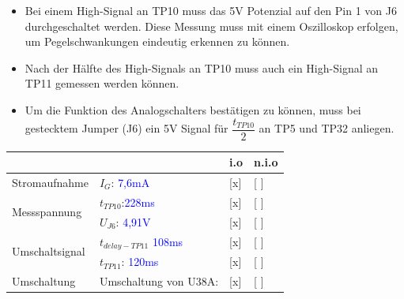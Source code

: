 \begin{itemize}
	\item{Bei einem High-Signal an TP10 muss das 5V Potenzial auf den Pin 1 von J6 durchgeschaltet werden. Diese Messung muss mit einem Oszilloskop erfolgen, um Pegelschwankungen eindeutig erkennen zu können.}
	
	\item{Nach der Hälfte des High-Signals an TP10 muss auch ein High-Signal an TP11 gemessen werden können.}
	
	\item{Um die Funktion des Analogschalters bestätigen zu können, muss bei gestecktem Jumper (J6) ein 5V Signal für $\dfrac{t_{TP10}}{2}$ an TP5 und TP32 anliegen.}
\end{itemize}


\renewcommand{\arraystretch}{2}
\begin{tabularx}{\textwidth}{p{}| p{} | p{} | p{}}

 &  & i.o & n.i.o \\

\hline

Stromaufnahme & $I_{G}$: \textcolor{blue}{7,6mA} & [x] & [ ] \\

\hline

\multirow{2}{*}{Messspannung}
		& $t_{TP10}$:\textcolor{blue}{228ms}					& [x] & [ ] \\
		& $U_{J6}$: \textcolor{blue}{4,91V}						& [x] & [ ] \\

\hline

\multirow{2}{*}{Umschaltsignal}
		& $t_{delay-TP11}$	\textcolor{blue}{108ms} 				& [x] & [ ] \\
		& $t_{TP11}$: \textcolor{blue}{120ms}						& [x] & [ ] \\

\hline

Umschaltung & Umschaltung von U38A:	& [x] & [ ] \\
		
\end{tabularx}
\renewcommand{\arraystretch}{1}

